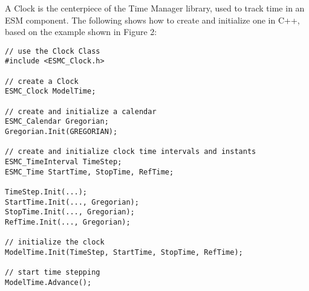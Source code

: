 
A Clock is the centerpiece of the Time Manager library, used to track time
in an ESM component.  The following shows how to create and initialize one
in C++, based on the example shown in Figure 2:

\begin{verbatim}
// use the Clock Class
#include <ESMC_Clock.h>

// create a Clock
ESMC_Clock ModelTime;

// create and initialize a calendar
ESMC_Calendar Gregorian;
Gregorian.Init(GREGORIAN);

// create and initialize clock time intervals and instants
ESMC_TimeInterval TimeStep;
ESMC_Time StartTime, StopTime, RefTime;

TimeStep.Init(...);
StartTime.Init(..., Gregorian);
StopTime.Init(..., Gregorian);
RefTime.Init(..., Gregorian);

// initialize the clock
ModelTime.Init(TimeStep, StartTime, StopTime, RefTime);

// start time stepping
ModelTime.Advance();
\end{verbatim}
